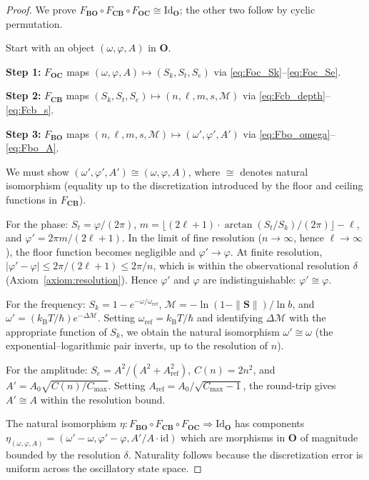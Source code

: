 \documentclass[twocolumn,10pt]{article}
\theoremstyle{remark}
\newcommand{\kB}{k_{\mathrm{B}}}
\newcommand{\Depth}{\mathcal{M}}
\newcommand{\Sk}{S_k}
\newcommand{\St}{S_t}
\newcommand{\Se}{S_e}
\newcommand{\Scoord}{\mathbf{S}}
\newcommand{\CatO}{\mathbf{O}}
\newcommand{\CatC}{\mathbf{C}}
\newcommand{\CatB}{\mathbf{B}}
\newcommand{\Foc}{F_{\CatO\CatC}}
\newcommand{\Fcb}{F_{\CatC\CatB}}
\newcommand{\Fbo}{F_{\CatB\CatO}}
\newcommand{\IdO}{\mathrm{Id}_{\CatO}}
\begin{document}
\begin{proof}
We prove $\Fbo \circ \Fcb \circ \Foc \cong \IdO$; the other two follow by cyclic permutation.

Start with an object $(\omega, \varphi, A)$ in $\CatO$.

\textbf{Step 1:} $\Foc$ maps $(\omega, \varphi, A) \mapsto (\Sk, \St, \Se)$ via \eqref{eq:Foc_Sk}--\eqref{eq:Foc_Se}.

\textbf{Step 2:} $\Fcb$ maps $(\Sk, \St, \Se) \mapsto (n, \ell, m, s, \Depth)$ via \eqref{eq:Fcb_depth}--\eqref{eq:Fcb_s}.

\textbf{Step 3:} $\Fbo$ maps $(n, \ell, m, s, \Depth) \mapsto (\omega', \varphi', A')$ via \eqref{eq:Fbo_omega}--\eqref{eq:Fbo_A}.

We must show $(\omega', \varphi', A') \cong (\omega, \varphi, A)$, where $\cong$ denotes natural isomorphism (equality up to the discretization introduced by the floor and ceiling functions in $\Fcb$).

For the phase: $\St = \varphi/(2\pi)$, $m = \lfloor (2\ell+1) \cdot \arctan(\St/\Sk)/(2\pi)\rfloor - \ell$, and $\varphi' = 2\pi m/(2\ell+1)$.
In the limit of fine resolution ($n \to \infty$, hence $\ell \to \infty$), the floor function becomes negligible and $\varphi' \to \varphi$.
At finite resolution, $|\varphi' - \varphi| \leq 2\pi/(2\ell+1) \leq 2\pi/n$, which is within the observational resolution $\delta$ (Axiom~\ref{axiom:resolution}).
Hence $\varphi'$ and $\varphi$ are indistinguishable: $\varphi' \cong \varphi$.

For the frequency: $\Sk = 1 - e^{-\omega/\omega_{\mathrm{ref}}}$, $\Depth = -\ln(1-\|\Scoord\|)/\ln b$, and $\omega' = (\kB T/\hbar) e^{-\Delta\Depth}$.
Setting $\omega_{\mathrm{ref}} = \kB T/\hbar$ and identifying $\Delta\Depth$ with the appropriate function of $\Sk$, we obtain the natural isomorphism $\omega' \cong \omega$ (the exponential--logarithmic pair inverts, up to the resolution of $n$).

For the amplitude: $\Se = A^2/(A^2 + A_{\mathrm{ref}}^2)$, $C(n) = 2n^2$, and $A' = A_0\sqrt{C(n)/C_{\max}}$.
Setting $A_{\mathrm{ref}} = A_0/\sqrt{C_{\max}-1}$, the round-trip gives $A' \cong A$ within the resolution bound.

The natural isomorphism $\eta: \Fbo \circ \Fcb \circ \Foc \Rightarrow \IdO$ has components $\eta_{(\omega,\varphi,A)} = (\omega'-\omega, \varphi'-\varphi, A'/A \cdot \mathrm{id})$ which are morphisms in $\CatO$ of magnitude bounded by the resolution $\delta$.
Naturality follows because the discretization error is uniform across the oscillatory state space.
\end{proof}
\end{document}
